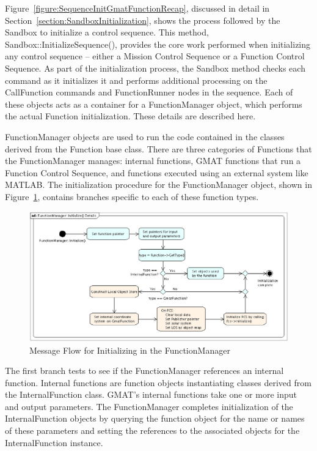 Figure~\ref{figure:SequenceInitGmatFunctionRecap}, discussed in detail in
Section~\ref{section:SandboxInitialization}, shows the process followed by the Sandbox to
initialize a control sequence.  This method, Sandbox::InitializeSequence(), provides the core
work performed when initializing any control sequence -- either a Mission Control Sequence or a
Function Control Sequence.  As part of the initialization process, the Sandbox method checks each
command as it initializes it and performs additional processing on the CallFunction commands and
FunctionRunner nodes in the sequence.  Each of these objects acts as a container for a
FunctionManager object, which performs the actual Function initialization.  These details are
described here.

FunctionManager objects are used to run the code contained in the classes derived from the Function
base class.  There are three categories of Functions that the FunctionManager manages: internal
functions, GMAT functions that run a Function Control Sequence, and functions executed using an
external system like MATLAB.  The initialization procedure for the FunctionManager object, shown in
Figure~\ref{figure:GmatFunctionInitialization}, contains branches specific to each of these
function types.

\begin{figure}[htb]
\begin{center}
\includegraphics[scale=0.5]{Images/CallFunctionInitializeDetails.eps}
\caption{\label{figure:GmatFunctionInitialization}Message Flow for Initializing in the
FunctionManager}
\end{center}
\end{figure}

The first branch tests to see if the FunctionManager references an internal function.  Internal
functions are function objects instantiating classes derived from the InternalFunction class. 
GMAT's internal functions take one or more input and output parameters.  The FunctionManager
completes initialization of the InternalFunction objects by querying the function object for the
name or names of these parameters and setting the references to the associated objects for the
InternalFunction instance.

